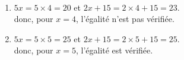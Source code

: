    \ \\ [-5mm]
   \begin{enumerate}
      \item $5x =5\times4 =20$ et $2x+15 =2\times4+15 =23$. \\
       donc, pour $x =4$, {\blue l'égalité n'est pas vérifiée}.
      \item $5x =5\times5 =25$ et $2x+15=2\times5+15 =25$. \\
       donc, pour $x =5$, {\blue l'égalité est vérifiée.}
   \end{enumerate}
